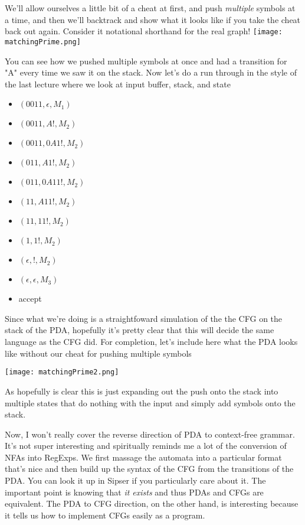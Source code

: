 \documentclass[11pt]{article}
\begin{document}
We'll allow ourselves a little bit of a cheat at first, and push \emph{multiple} symbols at a time, and then we'll backtrack and show what it looks like if you take the cheat back out again. Consider it notational shorthand for the real graph!
\texttt{[image: matchingPrime.png]}

You can see how we pushed multiple symbols at once and had a transition for "A" every time we saw it on the stack. Now let's do a run through in the style of the last lecture where we look at input buffer, stack, and state

\begin{itemize}
\item $(0011,\epsilon,M_1)$
\item $(0011,A!, M_2)$
\item $(0011,0A1!, M_2)$
\item $(011,A1!, M_2)$
\item $(011,0A11!, M_2)$
\item $(11, A11!, M_2)$
\item $(11, 11!, M_2)$
\item $(1, 1!, M_2)$
\item $(\epsilon, !, M_2)$
\item $(\epsilon, \epsilon, M_3)$
\item accept
\end{itemize}

Since what we're doing is a straightfoward simulation of the the CFG on the stack of the PDA, hopefully it's pretty clear that this will decide the same language as the CFG did. For completion, let's include here what the PDA looks like without our cheat for pushing multiple symbols

\texttt{[image: matchingPrime2.png]}

As hopefully is clear this is just expanding out the push onto the stack into multiple states that do nothing with the input and simply add symbols onto the stack.

Now, I won't really cover the reverse direction of PDA to context-free grammar. It's not super interesting and spiritually reminds me a lot of the conversion of NFAs into RegExps. We first massage the automata into a particular format that's nice and then build up the syntax of the CFG from the transitions of the PDA. You can look it up in Sipser if you particularly care about it. The important point is knowing that \emph{it exists} and thus PDAs and CFGs are equivalent. The PDA to CFG direction, on the other hand, is interesting because it tells us how to implement CFGs easily as a program.
\end{document}
